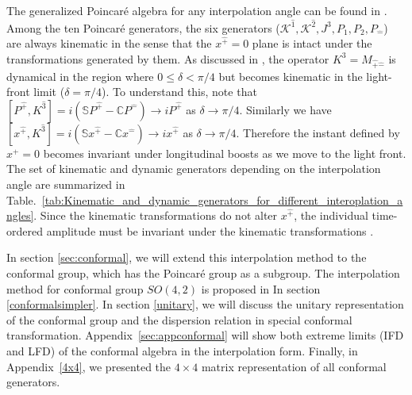 \documentclass[aps,reprint,notitlepage,nofootinbib,superscriptaddress]{revtex4-1}
\newcommand{\pT}{\hat{+}}
\newcommand{\mT}{\hat{-}}
\newcommand{\itP}[1]{\hat{#1}}
\begin{document}
The generalized Poincar\'e algebra for any interpolation angle can be found in \cite{Ji2001}. 
Among the ten Poincar\'e generators, the six generators ($\mathcal{K}^{\itP{1}}, \mathcal{K}^{\itP{2}}, J^{3}, P_{1}, P_{2}, P_{\mT}$) are always kinematic in the sense that the $x^{\pT}=0$ plane is intact under the transformations generated by them.
As discussed in \cite{Ji2001, Ji2012}, the operator $K^{3}=M_{\pT\mT}$ is dynamical in the region where $0\leq\delta<\pi/4$ but becomes kinematic in the light-front limit ($\delta=\pi/4$). To understand this, note that $[P^{\hat{+}},K^{\hat{3}}]=i(\mathbb{S}P^{\hat{+}}-\mathbb{C}P^{\hat{-}})\rightarrow iP^{\hat{+}}$ as $\delta\rightarrow\pi/4$. Similarly we have $[x^{\hat{+}},K^{\hat{3}}]=i(\mathbb{S}x^{\hat{+}}-\mathbb{C}x^{\hat{-}})\rightarrow i x^{\hat{+}}$ as $\delta\rightarrow\pi/4$. Therefore the instant defined by $x^+=0$ becomes invariant under longitudinal boosts as we move to the light front.
The set of kinematic and dynamic generators depending on the interpolation angle are summarized in Table.~\ref{tab:Kinematic_and_dynamic_generators_for_different_interoplation_angles}.
Since the kinematic transformations do not alter $x^{\pT}$, the individual time-ordered amplitude must be invariant under the kinematic transformations \cite{Ji2018QED}.

In section \ref{sec:conformal}, we will extend this interpolation method to the conformal group, which has the Poincar\'e group as a subgroup. The interpolation method for conformal group $SO(4,2)$ is proposed in In section \ref{conformalsimpler}. In section \ref{unitary}, we will discuss the unitary representation of the conformal group and the dispersion relation in special conformal transformation. Appendix~\ref{sec:appconformal} will show both extreme limits (IFD and LFD) of the conformal algebra in the interpolation form. Finally, in Appendix~\ref{4x4}, we presented the $4\times4$ matrix representation of all conformal generators. 
\end{document}
